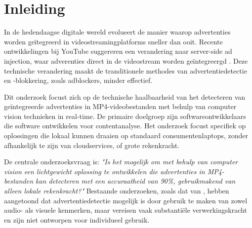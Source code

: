 


% 

\section{Inleiding}%
\label{sec:inleiding}

In de hedendaagse digitale wereld evolueert de manier waarop advertenties worden geïtegreerd in videostreamingplatforms sneller dan ooit. Recente ontwikkelingen bij YouTube suggereren een verandering naar server-side ad injection, waar adverenties direct in de videostream worden geïntegreergd \cite{Li2024}. Deze technische verandering maakt de tranditionele methodes van advertentiedetectie en -blokkering, zoals adblockers, minder effectief.

Dit onderzoek focust zich op de technische haalbaarheid van het detecteren van geïntegreerde advertenties in MP4-videobestanden met behulp van computer vision technieken in real-time. De primaire doelgroep zijn softwareontwikkelaars die software ontwikkelen voor contentanalyse. Het onderzoek focust specifiek op oplossingen die lokaal kunnen draaien op standaard consumentenlaptops, zonder afhankelijk te zijn van cloudservices, of grote rekenkracht.

De centrale onderzoeksvraag is: \textit{"Is het mogelijk om met behulp van computer vision een lichtgewicht oplossing te ontwikkelen die advertenties in MP4-bestanden kan detecteren met een accuraatheid van 90\%, gebruikmakend van alleen lokale rekenkracht?"} Bestaande onderzoeken, zoals dat van \textcite{Covell2007}, hebben aangetoond dat advertentiedetectie mogelijk is door gebruik te maken van zowel audio- als visuele kenmerken, maar vereisen vaak substantiële verwerkingskracht en zijn niet ontworpen voor individueel gebruik.

